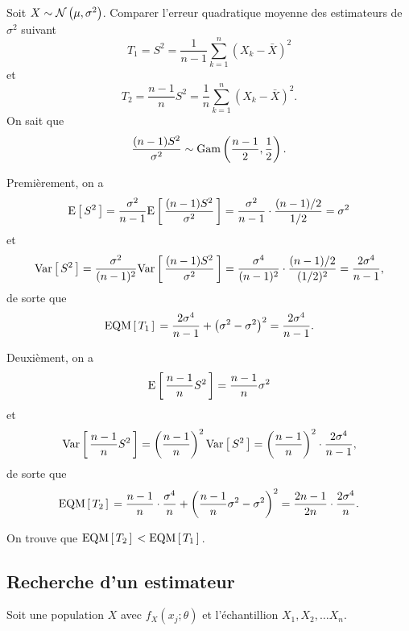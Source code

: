 \documentclass[11pt]{article}
\newcommand\Gam[2]{%
	\ensuremath{%
		\mathrm{Gam}\left(#1,#2\right)%
	}%
}%
\newcommand\Norm[2]{%
	\ensuremath{%
		\mathcal{N}\left(#1,#2\right)%
	}%
}%
\newcommand\Esp[1]{%
	\ensuremath{%
		\mathrm{E}\left[\,#1\,\right]%
	}%
}%
\newcommand\Var[1]{%
	\ensuremath{%
		\mathrm{Var}\left[\,#1\,\right]%
	}%
}%
\newcommand\EQM[1]{%
	\ensuremath{%
		\mathrm{EQM}\left[\,#1\,\right]\,%
	}%
}%
\theoremstyle{remark}
\theoremstyle{definition}
\begin{document}
\begin{exemple}
	Soit $X\sim\Norm{\mu}{\sigma^2}$. Comparer l'erreur quadratique moyenne
	des estimateurs de $\sigma^2$ suivant
	\begin{equation*}
		T_1
		=S^2
		=\frac{1}{n-1}\sum_{k=1}^n\left(X_k-\bar{X}\right)^2
	\end{equation*}
	et
	\begin{equation*}
		T_2
		=\frac{n-1}{n}S^2
		=\frac{1}{n}\sum_{k=1}^n\left(X_k-\bar{X}\right)^2.
	\end{equation*}
	On sait que
	\begin{equation*}
		\frac{(n-1)S^2}{\sigma^2}\sim\Gam{\frac{n-1}{2}}{\frac{1}{2}}.
	\end{equation*}

	Premièrement, on a
	\begin{equation*}
		\Esp{S^2}
		=\frac{\sigma^2}{n-1}\Esp{\frac{(n-1)S^2}{\sigma^2}}
		=\frac{\sigma^2}{n-1}\cdot\frac{(n-1)/2}{1/2}
		=\sigma^2
	\end{equation*}
	et
	\begin{equation*}
		\Var{S^2}
		=\frac{\sigma^2}{(n-1)^2}\Var{\frac{(n-1)S^2}{\sigma^2}}
		=\frac{\sigma^4}{(n-1)^2}\cdot\frac{(n-1)/2}{(1/2)^2}
		=\frac{2\sigma^4}{n-1},
	\end{equation*}
	de sorte que
	\begin{equation*}
		\EQM{T_1}
		=\frac{2\sigma^4}{n-1}+\left(\sigma^2-\sigma^2\right)^2
		=\frac{2\sigma^4}{n-1}.
	\end{equation*}

	Deuxièment, on a
	\begin{equation*}
		\Esp{\frac{n-1}{n}S^2}
		=\frac{n-1}{n}\sigma^2
	\end{equation*}
	et
	\begin{equation*}
		\Var{\frac{n-1}{n}S^2}
		=\left(\frac{n-1}{n}\right)^2\Var{S^2}
		=\left(\frac{n-1}{n}\right)^2\cdot\frac{2\sigma^4}{n-1},
	\end{equation*}
	de sorte que
	\begin{equation*}
		\EQM{T_2}
		=\frac{n-1}{n}\cdot\frac{\sigma^4}{n}+\left(\frac{n-1}{n}\sigma^2
			-\sigma^2\right)^2
		=\frac{2n-1}{2n}\cdot\frac{2\sigma^4}{n}.
	\end{equation*}

	On trouve que $\EQM{T_2}<\EQM{T_1}$.
\end{exemple}

\subsection{Recherche d'un estimateur}
Soit une population $X$ avec $f_X(x_j;\theta)$ et l'échantillion $X_1,X_2,\dots
X_n$.
\end{document}
